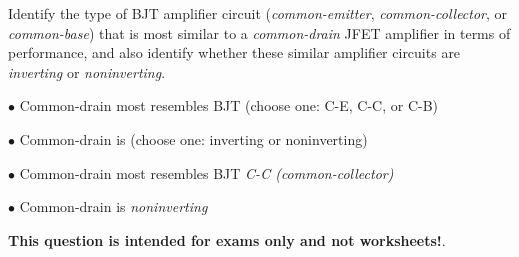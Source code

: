 

Identify the type of BJT amplifier circuit ({\it common-emitter}, {\it common-collector}, or {\it common-base}) that is most similar to a {\it common-drain} JFET amplifier in terms of performance, and also identify whether these similar amplifier circuits are {\it inverting} or {\it noninverting}.

\medskip
\item{$\bullet$} Common-drain most resembles BJT (choose one: C-E, C-C, or C-B)
\item{$\bullet$} Common-drain is (choose one: inverting or noninverting)
\medskip







\medskip
\item{$\bullet$} Common-drain most resembles BJT {\it C-C (common-collector)}
\item{$\bullet$} Common-drain is {\it noninverting}
\medskip







{\bf This question is intended for exams only and not worksheets!}.




